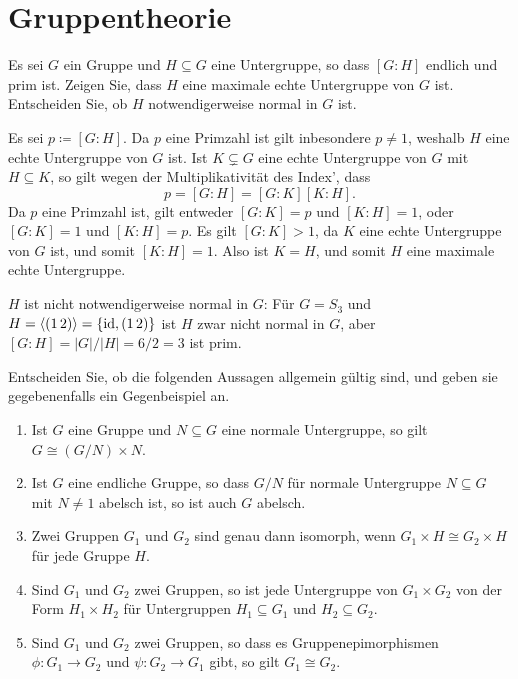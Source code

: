 \section{Gruppentheorie}


\begin{question}[subtitle = Ein Kriterium für maximale Untergruppen]
  Es sei $G$ ein Gruppe und $H \subseteq G$ eine Untergruppe, so dass $[G : H]$ endlich und prim ist.
  Zeigen Sie, dass $H$ eine maximale echte Untergruppe von $G$ ist. Entscheiden Sie, ob $H$ notwendigerweise normal in $G$ ist.
\end{question}


\begin{solution}
  Es sei $p \coloneqq [G : H]$.
  Da $p$ eine Primzahl ist gilt inbesondere $p \neq 1$, weshalb $H$ eine echte Untergruppe von $G$ ist.
  Ist $K \subsetneq G$ eine echte Untergruppe von $G$ mit $H \subseteq K$, so gilt wegen der Multiplikativität des Index’, dass 
  \[
      p
    = [G : H]
    = [G : K] [K : H].
  \]
  Da $p$ eine Primzahl ist, gilt entweder $[G : K] = p$ und $[K : H] = 1$, oder $[G : K] = 1$ und $[K : H] = p$.
  Es gilt $[G : K] > 1$, da $K$ eine echte Untergruppe von $G$ ist, und somit $[K : H] = 1$.
  Also ist $K = H$, und somit $H$ eine maximale echte Untergruppe.
  
  $H$ ist nicht notwendigerweise normal in $G$:
  Für $G = S_3$ und $H = \left\langle (1\,2) \right\rangle = \{\operatorname{id}, (1\,2)\}$ ist $H$ zwar nicht normal in $G$, aber $[G : H] = |G|/|H| = 6/2 = 3$ ist prim.
\end{solution}


\begin{question}[subtitle = Multiple Choice I]
  Entscheiden Sie, ob die folgenden Aussagen allgemein gültig sind, und geben sie gegebenenfalls ein Gegenbeispiel an.
  \begin{enumerate}
    \item
      Ist $G$ eine Gruppe und $N \subseteq G$ eine normale Untergruppe, so gilt $G \cong (G/N) \times N$.
    \item
      Ist $G$ eine endliche Gruppe, so dass $G/N$ für normale Untergruppe $N \subseteq G$ mit $N \neq 1$ abelsch ist, so ist auch $G$ abelsch.
    \item
      Zwei Gruppen $G_1$ und $G_2$ sind genau dann isomorph, wenn $G_1 \times H \cong G_2 \times H$ für jede Gruppe $H$.
    \item
      Sind $G_1$ und $G_2$ zwei Gruppen, so ist jede Untergruppe von $G_1 \times G_2$ von der Form $H_1 \times H_2$ für Untergruppen $H_1 \subseteq G_1$ und $H_2 \subseteq G_2$.
    \item
      Sind $G_1$ und $G_2$ zwei Gruppen, so dass es Gruppenepimorphismen $\phi \colon G_1 \to G_2$ und $\psi \colon G_2 \to G_1$ gibt, so gilt $G_1 \cong G_2$.
  \end{enumerate}
\end{question}


